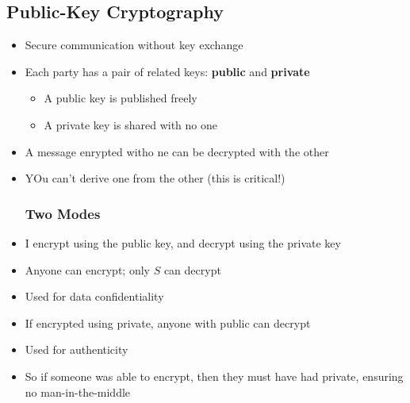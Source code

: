 \subsection{Public-Key Cryptography}
\begin{itemize}
	\item Secure communication without key exchange
	\item Each party has a pair of related keys: \textbf{public} and \textbf{private}
	\begin{itemize}
		\item A public key is published freely
		\item A private key is shared with no one
	\end{itemize}
	\item A message enrypted witho ne can be decrypted with the other
	\item YOu can't derive one from the other (this is critical!)
	\subsubsection{Two Modes}
	\item I encrypt using the public key, and decrypt using the private key
	\item Anyone can encrypt; only $S$ can decrypt
	\item Used for data confidentiality
	\item If encrypted using private, anyone with public can decrypt
	\item Used for authenticity
	\item So if someone was able to encrypt, then they must have had private, ensuring no man-in-the-middle
\end{itemize}

